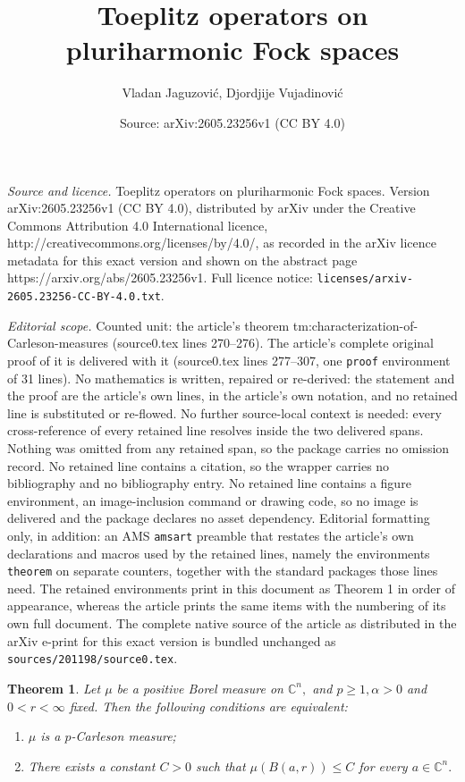 \documentclass[10pt,a4paper]{amsart}
\title{Toeplitz operators on pluriharmonic Fock spaces}
\author{Vladan Jaguzović, Djordjije Vujadinovi\'c}
\date{Source: arXiv:2605.23256v1 (CC BY 4.0)}
\newtheorem{theorem}{Theorem}
\begin{document}
\maketitle

\noindent\emph{Source and licence.} Toeplitz operators on pluriharmonic Fock spaces. Version arXiv:2605.23256v1 (CC BY 4.0), distributed by arXiv under the Creative Commons Attribution 4.0 International licence, http://creativecommons.org/licenses/by/4.0/, as recorded in the arXiv licence metadata for this exact version and shown on the abstract page https://arxiv.org/abs/2605.23256v1. Full licence notice: \texttt{licenses/arxiv-2605.23256-CC-BY-4.0.txt}.\par\smallskip

\noindent\textit{Editorial scope.} Counted unit: the article's theorem tm:characterization-of-Carleson-measures (source0.tex lines 270--276). The article's complete original proof of it is delivered with it (source0.tex lines 277--307, one \texttt{proof} environment of 31 lines). No mathematics is written, repaired or re-derived: the statement and the proof are the article's own lines, in the article's own notation, and no retained line is substituted or re-flowed.  No further source-local context is needed: every cross-reference of every retained line resolves inside the two delivered spans.  Nothing was omitted from any retained span, so the package carries no omission record.  No retained line contains a citation, so the wrapper carries no bibliography and no bibliography entry.  No retained line contains a figure environment, an image-inclusion command or drawing code, so no image is delivered and the package declares no asset dependency.  Editorial formatting only, in addition: an AMS \texttt{amsart} preamble that restates the article's own declarations and macros used by the retained lines, namely the environments \texttt{theorem} on separate counters, together with the standard packages those lines need.  The retained environments print in this document as Theorem 1 in order of appearance, whereas the article prints the same items with the numbering of its own full document.  The complete native source of the article as distributed in the arXiv e-print for this exact version is bundled unchanged as \texttt{sources/201198/source0.tex}.
\begin{theorem}\label{tm:characterization-of-Carleson-measures}
	Let $\mu$ be a positive Borel measure on $\mathbb{C}^{n},$ and $p\geq 1,\alpha >0$ and $0<r<\infty$  fixed. Then the following conditions are equivalent:
	\begin{enumerate}
		\item $\mu$  is a $p$-Carleson measure;
		\item There exists a constant $C>0$  such that $\mu(B(a,r))\leq C$ for every $a \in \mathbb{C}^{n}.$
	\end{enumerate}
\end{theorem}
\end{document}

